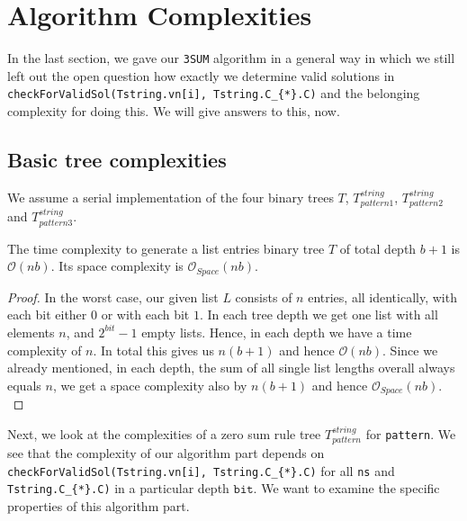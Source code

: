 \section{Algorithm Complexities}
\label{s:algorithmcomplexities}
In the last section, we gave our \texttt{3SUM} algorithm in a general way in which we still left out the open question how exactly we determine valid solutions in \texttt{checkForValidSol(Tstring.vn[i], Tstring.C\_\{*\}.C)} and the belonging complexity for doing this. We will give answers to this, now.
\subsection{Basic tree complexities}
\label{ss:basictreecomplexities}
We assume a serial implementation of the four binary trees $T$, $T^{string}_{pattern1}$, $T^{string}_{pattern2}$ and $T^{string}_{pattern3}$.

\begin{theorem}[Complexities of $T$]
    The time complexity to generate a list entries binary tree $T$ of total depth $b + 1$ is $\mathcal{O}\left(nb\right)$. Its space complexity is $\mathcal{O}_{Space}\left(nb\right)$.
\label{theorem:complexitiesofT}
\end{theorem}

\begin{proof}
    In the worst case, our given list $L$ consists of $n$ entries, all identically, with each bit either $0$ or with each bit $1$. In each tree depth we get one list with all elements $n$, and $2^{bit} - 1$ empty lists. Hence, in each depth we have a time complexity of $n$. In total this gives us $n\left(b + 1\right)$ and hence $\mathcal{O}\left(nb\right)$. Since we already mentioned, in each depth, the sum of all single list lengths overall always equals $n$, we get a space complexity also by $n\left(b+1\right)$ and hence $\mathcal{O}_{Space}\left(nb\right)$.
\label{proof:complexitiesofT}
\end{proof}

Next, we look at the complexities of a zero sum rule tree $T^{string}_{pattern}$ for \texttt{pattern}. We see that the complexity of our algorithm part depends on \texttt{checkForValidSol(Tstring.vn[i], Tstring.C\_\{*\}.C)} for all \texttt{ns} and \texttt{Tstring.C\_\{*\}.C)} in a particular depth $\texttt{bit}$. We want to examine the specific properties of this algorithm part. 

